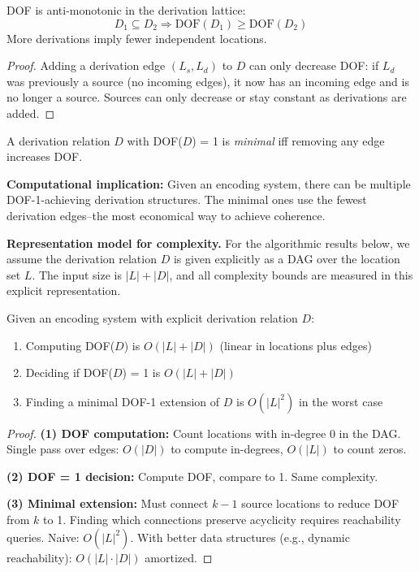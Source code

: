 \begin{theorem}\label{thm:dof-antimonotone}
DOF is anti-monotonic in the derivation lattice:
\[
D_1 \subseteq D_2 \Rightarrow \text{DOF}(D_1) \geq \text{DOF}(D_2)
\]
More derivations imply fewer independent locations.
\end{theorem}

\begin{proof}
Adding a derivation edge $(L_s, L_d)$ to $D$ can only decrease DOF: if $L_d$ was previously a source (no incoming edges), it now has an incoming edge and is no longer a source. Sources can only decrease or stay constant as derivations are added.
\end{proof}

\begin{corollary}[Minimal DOF = 1 Derivations]\label{cor:minimal-dof1}
A derivation relation $D$ with DOF($D$) = 1 is \emph{minimal} iff removing any edge increases DOF.
\end{corollary}

\textbf{Computational implication:} Given an encoding system, there can be multiple DOF-1-achieving derivation structures. The minimal ones use the fewest derivation edges--the most economical way to achieve coherence.

\textbf{Representation model for complexity.} For the algorithmic results below, we assume the derivation relation $D$ is given explicitly as a DAG over the location set $L$. The input size is $|L| + |D|$, and all complexity bounds are measured in this explicit representation.

\begin{theorem}\label{thm:dof-complexity}
Given an encoding system with explicit derivation relation $D$:
\begin{enumerate}
\tightlist
\item Computing DOF($D$) is $O(|L| + |D|)$ (linear in locations plus edges)
\item Deciding if DOF($D$) = 1 is $O(|L| + |D|)$
\item Finding a minimal DOF-1 extension of $D$ is $O(|L|^2)$ in the worst case
\end{enumerate}
\end{theorem}

\begin{proof}
\textbf{(1) DOF computation:} Count locations with in-degree 0 in the DAG. Single pass over edges: $O(|D|)$ to compute in-degrees, $O(|L|)$ to count zeros.

\textbf{(2) DOF = 1 decision:} Compute DOF, compare to 1. Same complexity.

\textbf{(3) Minimal extension:} Must connect $k-1$ source locations to reduce DOF from $k$ to 1. Finding which connections preserve acyclicity requires reachability queries. Naive: $O(|L|^2)$. With better data structures (e.g., dynamic reachability): $O(|L| \cdot |D|)$ amortized.
\end{proof}

